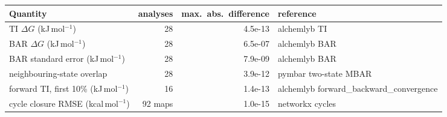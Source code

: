 \begin{tabular}{lrrl}
\toprule
Quantity & analyses & max.\ abs.\ difference & reference \\
\midrule
TI $\Delta G$ (kJ\,mol$^{-1}$) & 28 & 4.5e-13 & alchemlyb TI \\
BAR $\Delta G$ (kJ\,mol$^{-1}$) & 28 & 6.5e-07 & alchemlyb BAR \\
BAR standard error (kJ\,mol$^{-1}$) & 28 & 7.9e-09 & alchemlyb BAR \\
neighbouring-state overlap & 28 & 3.9e-12 & pymbar two-state MBAR \\
forward TI, first 10\% (kJ\,mol$^{-1}$) & 16 & 1.4e-13 & alchemlyb forward\_backward\_convergence \\
cycle closure RMSE (kcal\,mol$^{-1}$) & 92 maps & 1.0e-15 & networkx cycles \\
\bottomrule
\end{tabular}
